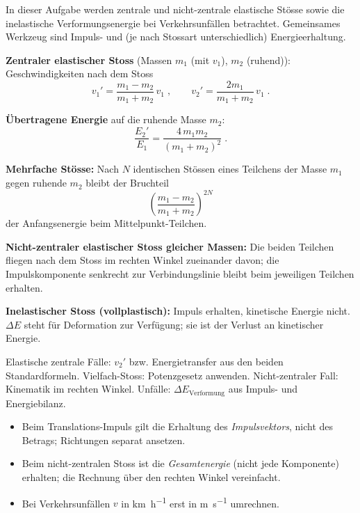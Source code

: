 
In dieser Aufgabe werden zentrale und nicht-zentrale elastische Stösse sowie
die inelastische Verformungsenergie bei Verkehrsunfällen betrachtet. Gemeinsames
Werkzeug sind Impuls- und (je nach Stossart unterschiedlich) Energieerhaltung.

\begin{werkzeugkasten}[Werkzeuge]
\textbf{Zentraler elastischer Stoss} (Massen $m_1$ (mit $v_1$), $m_2$ (ruhend)):
Geschwindigkeiten nach dem Stoss
\begin{equation}
  v_1' = \frac{m_1-m_2}{m_1+m_2}\,v_1\;,\qquad
  v_2' = \frac{2m_1}{m_1+m_2}\,v_1\;.
\end{equation}

\textbf{Übertragene Energie} auf die ruhende Masse $m_2$:
\begin{equation}
  \frac{E_2'}{E_1}
  = \frac{4\,m_1 m_2}{(m_1+m_2)^2}\;.
\end{equation}

\textbf{Mehrfache Stösse:} Nach $N$ identischen Stössen eines Teilchens der
Masse $m_1$ gegen ruhende $m_2$ bleibt der Bruchteil
\begin{equation}
  \left(\frac{m_1-m_2}{m_1+m_2}\right)^{2N}
\end{equation}
der Anfangsenergie beim Mittelpunkt-Teilchen.

\textbf{Nicht-zentraler elastischer Stoss gleicher Massen:} Die beiden
Teilchen fliegen nach dem Stoss im rechten Winkel zueinander davon; die
Impulskomponente senkrecht zur Verbindungslinie bleibt beim jeweiligen
Teilchen erhalten.

\textbf{Inelastischer Stoss (vollplastisch):} Impuls erhalten, kinetische
Energie nicht. $\Delta E$ steht für Deformation zur Verfügung; sie ist der
Verlust an kinetischer Energie.
\end{werkzeugkasten}

\begin{werkzeugkasten}
Elastische zentrale Fälle: $v_2'$ bzw. Energietransfer aus den beiden
Standardformeln. Vielfach-Stoss: Potenzgesetz anwenden. Nicht-zentraler Fall:
Kinematik im rechten Winkel. Unfälle: $\Delta E_\mathrm{Verformung}$ aus
Impuls- und Energiebilanz.
\end{werkzeugkasten}

\begin{achtung}
\begin{itemize}
  \item Beim Translations-Impuls gilt die Erhaltung des \emph{Impulsvektors},
       nicht des Betrags; Richtungen separat ansetzen.
  \item Beim nicht-zentralen Stoss ist die \emph{Gesamtenergie} (nicht jede
       Komponente) erhalten; die Rechnung über den rechten Winkel vereinfacht.
  \item Bei Verkehrsunfällen $v$ in \unit{\kilo\metre\per\hour} erst in
       \unit{\metre\per\second} umrechnen.
\end{itemize}
\end{achtung}
